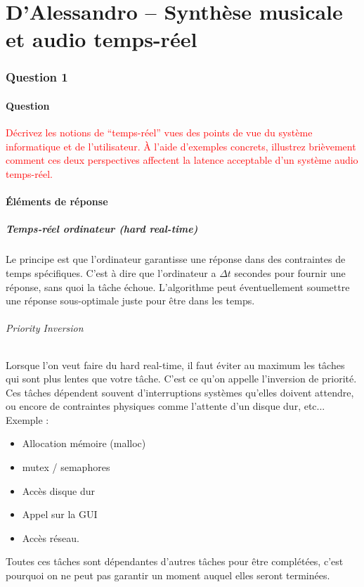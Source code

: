 \documentclass[letterpaper, 12pt]{article}
\newcommand{\alinea}{
\hspace*{0.5cm}}
\newcommand{\red}[1]{
	\textcolor{red}{#1}}
\begin{document}
\part{D'Alessandro -- Synthèse musicale et audio temps-réel}
	\section{Question 1}
		\subsection{Question}
			\alinea \red{Décrivez les notions de “temps-réel” vues des points de vue du système informatique et de l’utilisateur. 
				À l’aide d’exemples concrets, illustrez brièvement comment ces deux perspectives affectent la latence acceptable d’un 
				système audio temps-réel.}
		\subsection{\'Eléments de réponse}
			\subsubsection*{Temps-réel ordinateur (hard real-time)}
				\alinea Le principe est que l'ordinateur garantisse une réponse dans des contraintes de temps spécifiques.
					C'est à dire que l'ordinateur a $\Delta t$ secondes pour fournir une réponse, sans quoi la tâche échoue.
					L'algorithme peut éventuellement soumettre une réponse sous-optimale juste pour être dans les temps.
				\paragraph{Priority Inversion} Lorsque l'on veut faire du hard real-time, il faut éviter au maximum
					les tâches qui sont plus lentes que votre tâche. C'est ce qu'on appelle l'inversion de priorité.
					Ces tâches dépendent souvent d'interruptions systèmes qu'elles doivent attendre, ou encore de contraintes
					physiques comme l'attente d'un disque dur, etc... Exemple :
					\begin{itemize}
						\setlength\itemsep{0cm}
						\item Allocation mémoire (malloc)
						\item mutex / semaphores
						\item Accès disque dur
						\item Appel sur la GUI
						\item Accès réseau.
					\end{itemize}
					Toutes ces tâches sont dépendantes d'autres tâches pour être complétées, c'est pourquoi on ne peut pas 
					garantir un moment auquel elles seront terminées.
\end{document}
